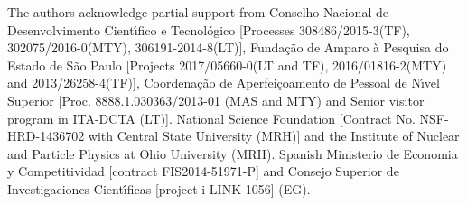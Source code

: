 \documentclass[twocolumn,amsmath,amssymb,epsfig,aps,prl]{revtex4}
\begin{document}
 {\small
The authors acknowledge partial support from 
Conselho Nacional de Desenvolvimento Cient\'\i fico e Tecnol\'ogico
[Processes 308486/2015-3(TF), 302075/2016-0(MTY), 306191-2014-8(LT)], 
Funda\c c\~ao de Amparo \`a Pesquisa do Estado de S\~ao Paulo
[Projects 2017/05660-0(LT and TF),  2016/01816-2(MTY) and 2013/26258-4(TF)],
Coordena\c c\~ao de Aperfei\c coamento de Pessoal de N\'\i vel Superior
[Proc. 8888.1.030363/2013-01 (MAS and MTY) and Senior visitor program in ITA-DCTA (LT)].
National Science Foundation [Contract No. NSF-HRD-1436702 with Central State University (MRH)]
and the Institute of Nuclear and Particle Physics at Ohio University (MRH).
Spanish Ministerio de Economia y Competitividad [contract FIS2014-51971-P] and 
Consejo Superior de Investigaciones Cient\'\i ficas [project i-LINK 1056] (EG).}
\end{document}
